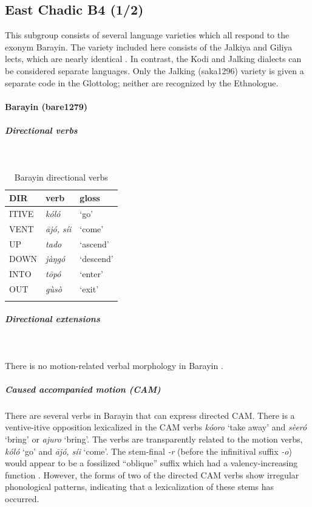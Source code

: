 \subsection{East Chadic B4 (1/2)}

This subgroup consists of several language varieties which all respond to the exonym Barayin. The variety included here consists of the Jalkiya and Giliya lects, which are nearly identical \citep{lovestrandDialectsBarainEast2011}. In contrast, the Kodi and Jalking dialects can be considered separate languages. Only the Jalking (saka1296) variety is given a separate code in the Glottolog; neither are recognized by the Ethnologue. 

\paragraph*{Barayin (bare1279)} \label{bara}

\subparagraph{Directional verbs}~

\begin{table}[H]
	\caption{Barayin directional verbs} 
	\label{tab:baraV}
	\begin{tabular}{lll} %
		\lsptoprule
		DIR & verb & gloss   \\ %
		\midrule
		ITIVE & \textit{kóló} & `go' \\
		VENT & \textit{ājó, síi} & `come' \\
		UP & \textit{tado} & `ascend' \\
		DOWN & \textit{jàŋgó} & `descend' \\
		INTO& \textit{tōpó} & `enter' \\	
		OUT & \textit{gùsò} & `exit' \\
		\lspbottomrule
	\end{tabular}
\end{table}

\subparagraph{Directional extensions}~

There is no motion-related verbal morphology in Barayin \citep{lovestrandLinguisticStructureBarain2012}.

\subparagraph{Caused accompanied motion (CAM)}

There are several verbs in Barayin that can express directed CAM. There is a ventive-itive opposition lexicalized in the CAM verbs \textit{kóoro} `take away' and \textit{sèeró} `bring' or \textit{ajuro} `bring'. The verbs are transparently related to the motion verbs, \textit{kóló} `go' and \textit{ājó, síi} `come'. The stem-final \textit{-r} (before the infinitival suffix \textit{-o}) would appear to be a fossilized ``oblique'' suffix which had a valency-increasing function \citep{robertsObliquesMawa2016}. However, the forms of two of the directed CAM verbs show irregular phonological patterns, indicating that a lexicalization of these stems has occurred. 

